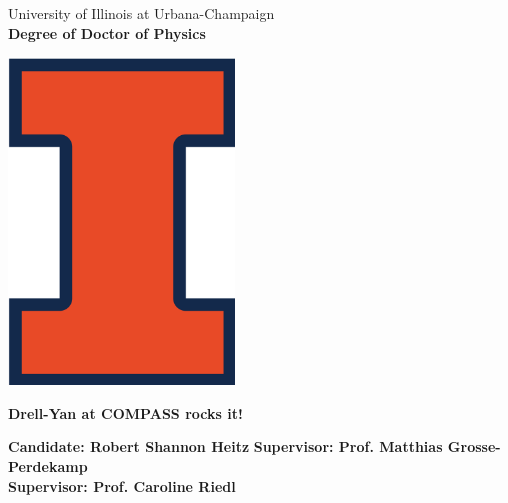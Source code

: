 

%

\thispagestyle{empty}
\begin{center}
\begin{large}
University of Illinois at Urbana-Champaign \\
{\bf Degree of Doctor of Physics} \\
\end{large}
\end{center}
\hrulefill

\vspace{1cm}
\begin{center}
\includegraphics[width=6cm]{Figs/illini.png}
\end{center}
\vspace{2cm}
\begin{center}
\Large{\bf Drell-Yan at COMPASS rocks it!}
\end{center}
\vspace{2cm}
\large{\bf Candidate: Robert Shannon Heitz} \vspace{0.5cm}\newline
\large{\bf Supervisor: Prof. Matthias Grosse-Perdekamp} \\
\large{\bf Supervisor: Prof. Caroline Riedl} \vspace{0.5cm}\newline
%




% 
